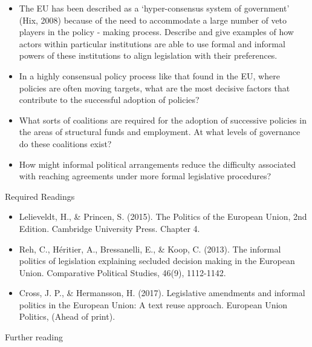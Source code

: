\begin{itemize}
	\item The EU has been described as a `hyper-consensus system of government' (Hix, 2008) because of the need to accommodate a large number of veto players in the policy - making process. Describe and give examples of how actors within particular institutions are able to use formal and informal powers of these institutions to align legislation with their preferences.
	\item In a highly consensual policy process like that found in the EU, where policies are often moving targets, what are the most decisive factors that contribute to the successful adoption of policies?
	\item What sorts of coalitions are required for the adoption of successive policies in the areas of structural funds and employment. At what levels of governance do these coalitions exist?
	\item How might informal political arrangements reduce the difficulty associated with reaching agreements under more formal legislative procedures?
\end{itemize}

\noindent Required Readings

\begin{itemize}
	\item Lelieveldt, H., \& Princen, S. (2015). The Politics of the European Union, 2nd Edition. Cambridge University Press. Chapter 4.
	\item Reh, C., Héritier, A., Bressanelli, E., \& Koop, C. (2013). The informal politics of legislation explaining secluded decision making in the European Union. Comparative Political Studies, 46(9), 1112-1142.
	\item Cross, J. P., \& Hermansson, H. (2017). Legislative amendments and informal politics in the European Union: A text reuse approach. European Union Politics, (Ahead of print).
\end{itemize}

\noindent Further reading

